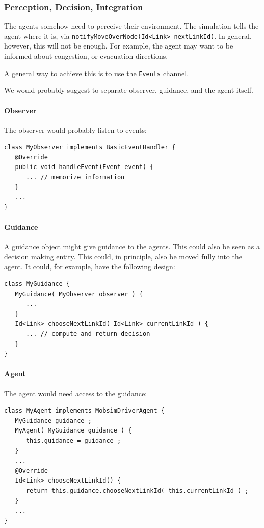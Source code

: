 \subsubsection{Perception, Decision, Integration}
The agents somehow need to perceive their environment. The simulation tells the agent where it is, via \lstinline$notifyMoveOverNode(Id<Link> nextLinkId)$.  In general, however, this will not be enough.  For example, the agent may want to be informed about congestion, or evacuation directions.

A general way to achieve this is to use the \lstinline$Events$ channel.

We would probably suggest to separate observer, guidance, and the agent itself.

\paragraph{Observer}

The observer would probably listen to events:
\begin{lstlisting}
class MyObserver implements BasicEventHandler {
   @Override
   public void handleEvent(Event event) {
      ... // memorize information
   }
   ...
}
\end{lstlisting}

\paragraph{Guidance}

A guidance object might give guidance to the agents. This could also be seen as a decision making entity. This could, in principle, also be moved fully into the agent. It could, for example, have the following design:
\begin{lstlisting}
class MyGuidance {
   MyGuidance( MyObserver observer ) {
      ...
   }
   Id<Link> chooseNextLinkId( Id<Link> currentLinkId ) {
      ... // compute and return decision
   }
}
\end{lstlisting}

\paragraph{Agent}

The agent would need access to the guidance:
\begin{lstlisting}
class MyAgent implements MobsimDriverAgent {
   MyGuidance guidance ;
   MyAgent( MyGuidance guidance ) {
      this.guidance = guidance ;
   }  
   ...
   @Override
   Id<Link> chooseNextLinkId() {
      return this.guidance.chooseNextLinkId( this.currentLinkId ) ;
   }
   ...
}
\end{lstlisting}

